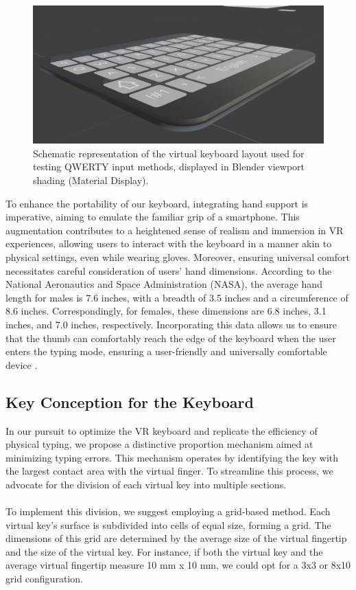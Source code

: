 \begin{figure}[h!]
    \centering
    \includegraphics[width=0.7\linewidth]{Development/keybordViewPort.PNG}
    \caption{Schematic representation of the virtual keyboard layout used for testing QWERTY input methods, displayed in Blender viewport shading (Material Display). }
    \label{fig:keyboard_sin}
\end{figure} \noindent
To enhance the portability of our keyboard, integrating hand support is imperative, aiming to emulate the familiar grip of a smartphone. This augmentation contributes to a heightened sense of realism and immersion in \ac{VR} experiences, allowing users to interact with the keyboard in a manner akin to physical settings, even while wearing gloves. Moreover, ensuring universal comfort necessitates careful consideration of users' hand dimensions. According to the National Aeronautics and Space Administration (NASA), the average hand length for males is 7.6 inches, with a breadth of 3.5 inches and a circumference of 8.6 inches. Correspondingly, for females, these dimensions are 6.8 inches, 3.1 inches, and 7.0 inches, respectively. Incorporating this data allows us to ensure that the thumb can comfortably reach the edge of the keyboard when the user enters the typing mode, ensuring a user-friendly and universally comfortable device \cite{nasa_anthropometry,nasa_hand_dimensions,nasa_performance}.

\subsection{Key Conception for the Keyboard}

In our pursuit to optimize the \ac{VR} keyboard and replicate the efficiency of physical typing, we propose a distinctive proportion mechanism aimed at minimizing typing errors. This mechanism operates by identifying the key with the largest contact area with the virtual finger. To streamline this process, we advocate for the division of each virtual key into multiple sections.\\ \\
To implement this division, we suggest employing a grid-based method. Each virtual key's surface is subdivided into cells of equal size, forming a grid. The dimensions of this grid are determined by the average size of the virtual fingertip and the size of the virtual key. For instance, if both the virtual key and the average virtual fingertip measure 10 mm x 10 mm, we could opt for a 3x3 or 8x10 grid configuration. \\ \\

